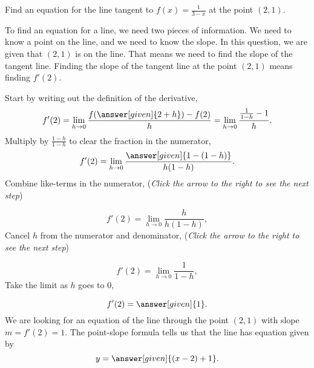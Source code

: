 \documentclass{ximera}
\begin{document}
\begin{example}
  Find an equation for the line tangent to $f(x) = \frac{1}{3-x}$ at the point $(2, 1)$.
  \begin{explanation}
    To find an equation for a line, we need two pieces of information.  We need to know
    a point on the line, and we need to know the slope.  In this question, we are given
    that $(2,1)$ is on the line.  That means we need to find the slope of the tangent line.
    Finding the slope of the tangent line at the point $(2,1)$ means finding $f'(2)$.
    
    Start by writing out the definition of the derivative,
    \[
    f'(2) = \lim_{h\to 0} \frac{f(\answer[given]{2+h})-f(2)}{h} = \lim_{h\to 0} \frac{\frac{1}{1-h} - 1}{h}.
    \]
    Multiply by $\frac{1-h}{1-h}$ to clear the fraction in the numerator,
    \[
    f'(2) = \lim_{h\to 0} \frac{\answer[given]{1 - (1-h)}}{h(1-h)}.
    \]
    Combine like-terms in the numerator, {\color{blue}(\emph{Click the arrow to the right to see the next step})}
    \begin{expandable}
    \[
    f'(2) = \lim_{h\to 0} \frac{h}{h(1-h)},
    \]
    Cancel $h$ from the numerator and denominator, {\color{blue}(\emph{Click the arrow to the right to see the next step})}
    \begin{expandable}
    \[
    f'(2) = \lim_{h\to 0} \frac{1}{1-h},
    \]		
    Take the limit as $h$ goes to $0$,
    \end{expandable}
    \end{expandable}
    \[
    f'(2) = \answer[given]{1}.
    \]
    We are looking for an equation of the line through the point
    $(2,1)$ with slope $m = f'(2) = 1$.  The point-slope formula tells
    us that the line has equation given by
    \[
    y= \answer[given]{(x-2) + 1}.
    \]
  \end{explanation}
\end{example}
\end{document}
